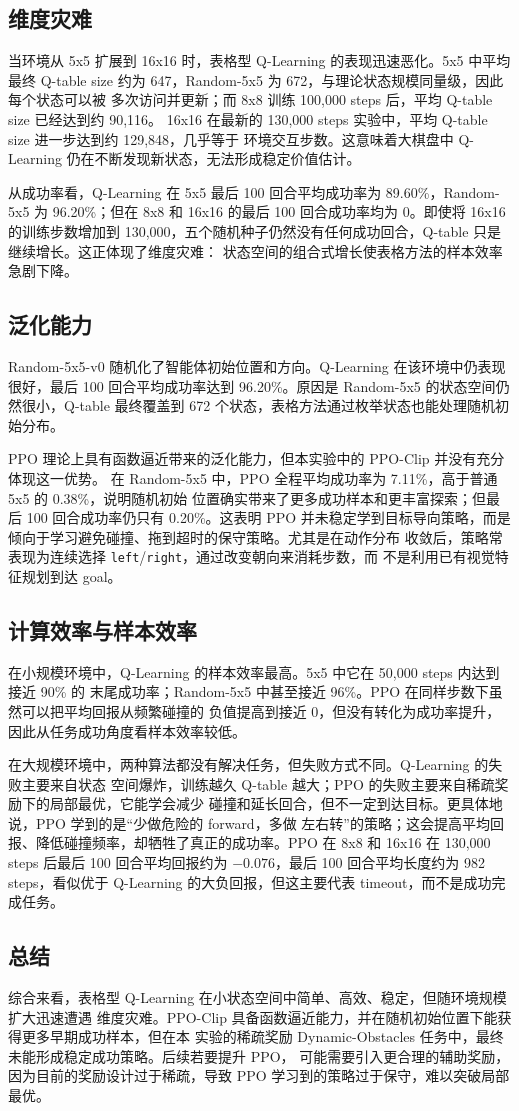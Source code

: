 \documentclass[UTF8,a4paper,fontset=fandol]{ctexart}
\begin{document}
\subsection{维度灾难}

当环境从 5x5 扩展到 16x16 时，表格型 Q-Learning 的表现迅速恶化。5x5 中平均最终
Q-table size 约为 647，Random-5x5 为 672，与理论状态规模同量级，因此每个状态可以被
多次访问并更新；而 8x8 训练 100,000 steps 后，平均 Q-table size 已经达到约 90,116。
16x16 在最新的 130,000 steps 实验中，平均 Q-table size 进一步达到约 129,848，几乎等于
环境交互步数。这意味着大棋盘中 Q-Learning 仍在不断发现新状态，无法形成稳定价值估计。

从成功率看，Q-Learning 在 5x5 最后 100 回合平均成功率为 89.60\%，Random-5x5 为
96.20\%；但在 8x8 和 16x16 的最后 100 回合成功率均为 0。即使将 16x16 的训练步数增加到
130,000，五个随机种子仍然没有任何成功回合，Q-table 只是继续增长。这正体现了维度灾难：
状态空间的组合式增长使表格方法的样本效率急剧下降。

\subsection{泛化能力}

Random-5x5-v0 随机化了智能体初始位置和方向。Q-Learning 在该环境中仍表现很好，最后 100
回合平均成功率达到 96.20\%。原因是 Random-5x5 的状态空间仍然很小，Q-table 最终覆盖到
672 个状态，表格方法通过枚举状态也能处理随机初始分布。

PPO 理论上具有函数逼近带来的泛化能力，但本实验中的 PPO-Clip 并没有充分体现这一优势。
在 Random-5x5 中，PPO 全程平均成功率为 7.11\%，高于普通 5x5 的 0.38\%，说明随机初始
位置确实带来了更多成功样本和更丰富探索；但最后 100 回合成功率仍只有 0.20\%。这表明 PPO
并未稳定学到目标导向策略，而是倾向于学习避免碰撞、拖到超时的保守策略。尤其是在动作分布
收敛后，策略常表现为连续选择 \texttt{left}/\texttt{right}，通过改变朝向来消耗步数，而
不是利用已有视觉特征规划到达 goal。

\subsection{计算效率与样本效率}

在小规模环境中，Q-Learning 的样本效率最高。5x5 中它在 50,000 steps 内达到接近 90\% 的
末尾成功率；Random-5x5 中甚至接近 96\%。PPO 在同样步数下虽然可以把平均回报从频繁碰撞的
负值提高到接近 0，但没有转化为成功率提升，因此从任务成功角度看样本效率较低。

在大规模环境中，两种算法都没有解决任务，但失败方式不同。Q-Learning 的失败主要来自状态
空间爆炸，训练越久 Q-table 越大；PPO 的失败主要来自稀疏奖励下的局部最优，它能学会减少
碰撞和延长回合，但不一定到达目标。更具体地说，PPO 学到的是“少做危险的 forward，多做
左右转”的策略；这会提高平均回报、降低碰撞频率，却牺牲了真正的成功率。PPO 在 8x8 和
16x16 在 130,000 steps 后最后 100 回合平均回报约为 \(-0.076\)，最后 100 回合平均长度约为
982 steps，看似优于 Q-Learning 的大负回报，但这主要代表 timeout，而不是成功完成任务。

\subsection{总结}

综合来看，表格型 Q-Learning 在小状态空间中简单、高效、稳定，但随环境规模扩大迅速遭遇
维度灾难。PPO-Clip 具备函数逼近能力，并在随机初始位置下能获得更多早期成功样本，但在本
实验的稀疏奖励 Dynamic-Obstacles 任务中，最终未能形成稳定成功策略。后续若要提升 PPO，
可能需要引入更合理的辅助奖励，因为目前的奖励设计过于稀疏，导致 PPO 学习到的策略过于保守，难以突破局部最优。
\end{document}
